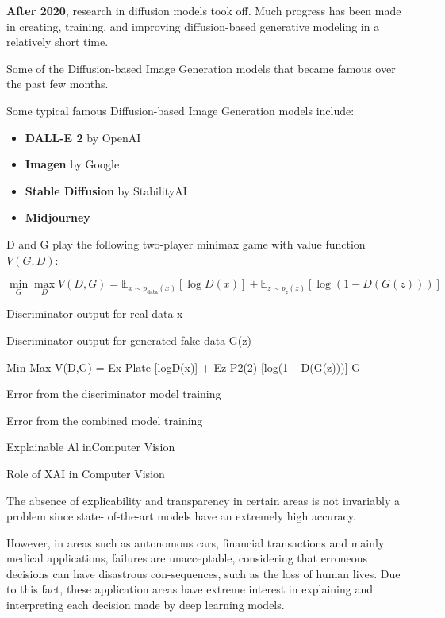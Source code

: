 \textbf{After 2020}, research in diffusion models took off. Much progress has been made in creating, training, and improving diffusion-based generative modeling in a relatively short time.

Some of the Diffusion-based Image Generation models that became famous over the past few months.

Some typical famous Diffusion-based Image Generation models include:
\begin{itemize}
    \item \textbf{DALL-E 2} by OpenAI
    \item \textbf{Imagen} by Google
    \item \textbf{Stable Diffusion} by StabilityAI
    \item \textbf{Midjourney}
\end{itemize}

D and G play the following two-player minimax game with value function $V (G, D)$:

\begin{equation*}
    \min_{G} \max_{D} V(D,G) = \mathbb{E}_{x \sim p_{\text{data}}(x)}[\log D(x)] + \mathbb{E}_{z \sim p_{z}(z)}[\log(1 - D(G(z)))]
\end{equation*}

Discriminator output for real data x

Discriminator output for generated fake data G(z)

Min Max V(D,G) = Ex-Plate [logD(x)] + Ez-P2(2) [log(1 – D(G(z)))] G

Error from the discriminator model training

Error from the combined model training








Explainable Al inComputer Vision

Role of XAI in Computer Vision

The absence of explicability and transparency in certain areas is not invariably a problem since state- of-the-art models have an extremely high accuracy.

However, in areas such as autonomous cars, financial transactions and mainly medical applications, failures are unacceptable, considering that erroneous decisions can have disastrous con-sequences, such as the loss of human lives. Due to this fact, these application areas have extreme interest in explaining and interpreting each decision made by deep learning models.

